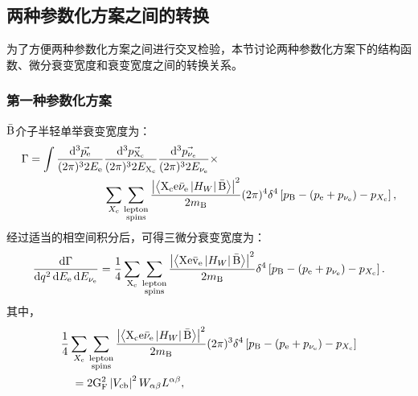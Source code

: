 \subsection{两种参数化方案之间的转换}
为了方便两种参数化方案之间进行交叉检验，本节讨论两种参数化方案下的结构函数、微分衰变宽度和衰变宽度之间的转换关系。

\subsubsection{第一种参数化方案}
$\mathrm{\bar{B}}$介子半轻单举衰变宽度为：
\begin{equation}
    \begin{aligned}
        \Gamma =  \int \frac{\mathrm{d}^{3} \vec{p_{\mathrm{e}}}}{(2 \pi)^{3} 2 E_{\mathrm{e}}} &\frac{\mathrm{d}^{3} \vec{p_{\mathrm{X_{c}}}}}{(2 \pi)^{3} 2 E_{\mathrm{X_{c}}}} \frac{\mathrm{d}^{3} \vec{p_{\nu_{e}}}}{(2 \pi)^{3} 2 E_{\mathrm{\nu_e}}}\times\\
         &\sum_{X_{\mathrm{c}}} \sum_{\substack{\text{lepton} \\ \text{spins}}} \frac{\left|\left\langle \mathrm{X_{\mathrm{c}} \mathrm{e} \mathrm{\bar{\nu}}_{\mathrm{e}} }\left| H_W \right| \mathrm{\bar{B}} \right\rangle \right|^2}{2 m_{\mathrm{B}}} (2 \pi)^4 \delta^4\left[p_{\mathrm{B}} - \left(p_{\mathrm{e}} + p_{\mathrm{\nu_e}}\right) - p_{X_{\mathrm{c}}}\right],
    \end{aligned}
\end{equation}
经过适当的相空间积分后，可得三微分衰变宽度为：
\begin{equation}
    \frac{\mathrm{d} \Gamma}{\mathrm{d} q^2 \, \mathrm{d} E_{\mathrm{e}} \, \mathrm{d} E_{\mathrm{\nu_e}}} = \frac{1}{4} \sum_{\mathrm{X}_{\mathrm{c}}} \sum_{\substack{\text{lepton} \\ \text{spins}}} \frac{\left|\left\langle\mathrm{ X e \bar{v}_{\mathrm{e}} }\left| H_W \right| \mathrm{\bar{B} }\right\rangle \right|^2}{2 m_{\mathrm{B}}} \delta^4 \left[ p_{\mathrm{B}} - \left( p_{\mathrm{e}} + p_{\mathrm{\nu_e}} \right) - p_{X_{\mathrm{c}}} \right] .
    \end{equation}    
其中，
\begin{equation}
    \begin{aligned}
    & \frac{1}{4} \sum_{{X_\mathrm{c}}} \sum_{\substack{\text{lepton} \\ \text{spins}}} \frac{\left|\left\langle \mathrm{X_{\mathrm{c}} e \bar{\nu}_{\mathrm{e}} }\left| H_W \right| \mathrm{\bar{B}} \right\rangle \right|^2}{2 m_{\mathrm{B}}} (2 \pi)^3 \delta^4 \left[ p_{\mathrm{B}} - \left( p_{\mathrm{e}} + p_{\mathrm{\nu_e}} \right) - p_{X_{\mathrm{c}}} \right] \\
    & \quad = 2 \mathrm{G_F^2} \left| V_{\mathrm{c b}} \right|^2 W_{\alpha \beta} L^{\alpha \beta},
    \end{aligned}
    \end{equation}
    
